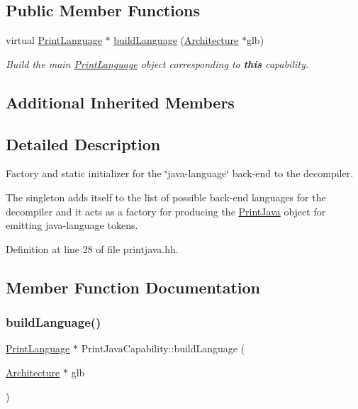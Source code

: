 \subsection*{Public Member Functions}
\begin{DoxyCompactItemize}
\item 
virtual \mbox{\hyperlink{class_print_language}{Print\+Language}} $\ast$ \mbox{\hyperlink{class_print_java_capability_ada79946f1067abeecf609e64bc348a88}{build\+Language}} (\mbox{\hyperlink{class_architecture}{Architecture}} $\ast$glb)
\begin{DoxyCompactList}\small\item\em Build the main \mbox{\hyperlink{class_print_language}{Print\+Language}} object corresponding to {\bfseries{this}} capability. \end{DoxyCompactList}\end{DoxyCompactItemize}
\subsection*{Additional Inherited Members}


\subsection{Detailed Description}
Factory and static initializer for the \char`\"{}java-\/language\char`\"{} back-\/end to the decompiler. 

The singleton adds itself to the list of possible back-\/end languages for the decompiler and it acts as a factory for producing the \mbox{\hyperlink{class_print_java}{Print\+Java}} object for emitting java-\/language tokens. 

Definition at line 28 of file printjava.\+hh.



\subsection{Member Function Documentation}
\mbox{\label{class_print_java_capability_ada79946f1067abeecf609e64bc348a88}} 
\subsubsection{\texorpdfstring{buildLanguage()}{buildLanguage()}}
{\footnotesize\ttfamily \mbox{\hyperlink{class_print_language}{Print\+Language}} $\ast$ Print\+Java\+Capability\+::build\+Language (\begin{DoxyParamCaption}\item[{\mbox{\hyperlink{class_architecture}{Architecture}} $\ast$}]{glb }\end{DoxyParamCaption})\hspace{0.3cm}{\ttfamily [virtual]}}



